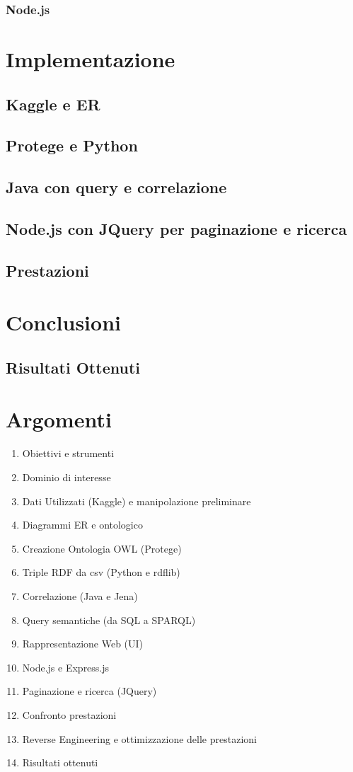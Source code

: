 \documentclass[Lau,binding=0.6cm,noexaminfo,oneside]{sapthesis}
\begin{document}
\subsection{Node.js}

\chapter{Implementazione}
\section{Kaggle e ER}
\section{Protege e Python}
\section{Java con query e correlazione}
\section{Node.js con JQuery per paginazione e ricerca}
\section{Prestazioni}

\chapter{Conclusioni}
\section{Risultati Ottenuti}


\chapter*{Argomenti}
\begin{enumerate}
  \item Obiettivi e strumenti
  \item Dominio di interesse
  \item Dati Utilizzati (Kaggle) e manipolazione preliminare
  \item Diagrammi ER e ontologico
  \item Creazione Ontologia OWL (Protege)
  \item Triple RDF da csv (Python e rdflib)
  \item Correlazione (Java e Jena)
  \item Query semantiche (da SQL a SPARQL)
  \item Rappresentazione Web (UI)
  \item Node.js e Express.js
  \item Paginazione e ricerca (JQuery)
  \item Confronto prestazioni
  \item Reverse Engineering e ottimizzazione delle prestazioni
  \item Risultati ottenuti
\end{enumerate}

\backmatter
\cleardoublepage
\end{document}
